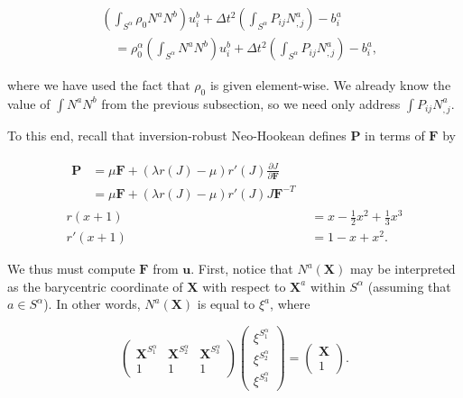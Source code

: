 \documentclass{article}
\begin{document}
\begin{subequations}
\begin{align}
& \left( \int_{S^{\alpha}} \rho_0 N^a N^b \right) u_i^b + \Delta t^2 \left( \int_{S^{\alpha}} P_{ij} N^a_{,j} \right) - b^a_i \\
& \quad = \rho_0^{\alpha} \left( \int_{S^{\alpha}} N^a N^b \right) u_i^b + \Delta t^2 \left( \int_{S^{\alpha}} P_{ij} N^a_{,j} \right) - b^a_i,
\end{align}
\end{subequations}

where we have used the fact that \(\rho_0\) is given element-wise.  We already know the value of \(\int N^a N^b\) from the previous subsection, so we need only address \(\int P_{ij} N^a_{,j}\).

To this end, recall that inversion-robust Neo-Hookean defines \(\mathbf{P}\) in terms of \(\mathbf{F}\) by

\begin{subequations} \label{P}
\begin{align}
\begin{split}
\mathbf{P} & = \mu \mathbf{F} + \left( \lambda r(J) - \mu \right) r'(J) \frac{\partial J}{\partial \mathbf{F}} \\
           & = \mu \mathbf{F} + \left( \lambda r(J) - \mu \right) r'(J) J \mathbf{F}^{-T}
\end{split} \\
r(x + 1) & = x - \frac{1}{2} x^2 + \frac{1}{3} x^3 \\
r'(x + 1) & = 1 - x + x^2.
\end{align}
\end{subequations}

We thus must compute \(\mathbf{F}\) from \(\mathbf{u}\).  First, notice that \(N^a(\mathbf{X})\) may be interpreted as the barycentric coordinate of \(\mathbf{X}\) with respect to \(\mathbf{X}^a\) within \(S^{\alpha}\) (assuming that \(a \in S^{\alpha}\)).  In other words, \(N^a(\mathbf{X})\) is equal to \(\xi^a\), where

\begin{equation}
\begin{pmatrix} \mathbf{X}^{S^{\alpha}_1} & \mathbf{X}^{S^{\alpha}_2} & \mathbf{X}^{S^{\alpha}_3} \\ 1 & 1 & 1 \end{pmatrix}
\begin{pmatrix} \xi^{S^{\alpha}_1} \\ \xi^{S^{\alpha}_2} \\ \xi^{S^{\alpha}_3} \end{pmatrix}
=
\begin{pmatrix} \mathbf{X} \\ 1 \end{pmatrix}.
\end{equation}
\end{document}
